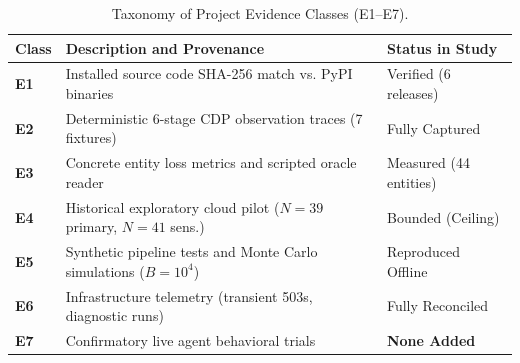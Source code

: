 \documentclass[conference]{IEEEtran}
\begin{document}
\begin{table}[t]
\centering
\footnotesize
\caption{Taxonomy of Project Evidence Classes (E1--E7).}
\label{tab:evidence_classes}
\begin{tabularx}{\columnwidth}{lXl}
\toprule
\textbf{Class} & \textbf{Description and Provenance} & \textbf{Status in Study} \\
\midrule
\textbf{E1} & Installed source code SHA-256 match vs. PyPI binaries & Verified (6 releases) \\
\textbf{E2} & Deterministic 6-stage CDP observation traces (7 fixtures) & Fully Captured \\
\textbf{E3} & Concrete entity loss metrics and scripted oracle reader & Measured (44 entities) \\
\textbf{E4} & Historical exploratory cloud pilot ($N=39$ primary, $N=41$ sens.) & Bounded (Ceiling) \\
\textbf{E5} & Synthetic pipeline tests and Monte Carlo simulations ($B=10^4$) & Reproduced Offline \\
\textbf{E6} & Infrastructure telemetry (transient 503s, diagnostic runs) & Fully Reconciled \\
\textbf{E7} & Confirmatory live agent behavioral trials & \textbf{None Added} \\
\bottomrule
\end{tabularx}
\end{table}
\end{document}
